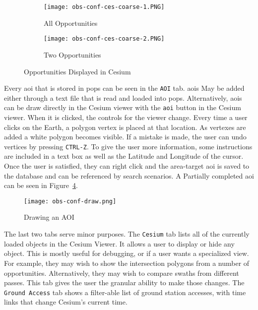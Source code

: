 \begin{figure}[h] 
    \centering
    \begin{subfigure}[b]{0.49\textwidth}
	\texttt{[image: obs-conf-ces-coarse-1.PNG]} 
	\caption{All Opportunities}
	\label{fig:obs-conf-opps-1} 
    \end{subfigure}
    \hfill
    \begin{subfigure}[b]{0.49\textwidth}
	\texttt{[image: obs-conf-ces-coarse-2.PNG]} 
	\caption{Two Opportunities}
	\label{fig:obs-conf-opps-2} 
    \end{subfigure}
    \caption{Opportunities Displayed in Cesium}
    \label{fig:obs-conf-opps} 
\end{figure}

Every \gls{aoi} that is stored in \gls{pops} can be seen in the \texttt{AOI}
tab. \gls{aois} May be added either through a text file that is read and loaded
into \gls{pops}. Alternatively, \glspl{aoi} can be draw directly in the Cesium
viewer with the \texttt{aoi} button in the Cesium viewer. When it is clicked,
the controls for the viewer change. Every time a user clicks on the Earth, a
polygon vertex is placed at that location. As vertexes are added a white
polygon becomes visible. If a mistake is made, the user can undo vertices by
pressing \texttt{CTRL-Z}. To give the user more information, some instructions
are included in a text box as well as the Latitude and Longitude of the cursor.
Once the user is satisfied, they can right click and the area-target \gls{aoi}
is saved to the database and can be referenced by search scenarios. A Partially
completed \gls{aoi} can be seen in Figure~\ref{fig:obs-conf-draw}.

\begin{figure}[h]
    \centering
    \texttt{[image: obs-conf-draw.png]} 
    \caption{Drawing an AOI}
    \label{fig:obs-conf-draw} 
\end{figure}

The last two tabs serve minor purposes. The \texttt{Cesium} tab lists all of
the currently loaded objects in the Cesium Viewer. It allows a user to display
or hide any object. This is mostly useful for debugging, or if a user wants a
specialized view. For example, they may wish to show the intersection polygons
from a number of opportunities. Alternatively, they may wish to compare swaths
from different passes. This tab gives the user the granular ability to make
those changes. The \texttt{Ground Access} tab shows a filter-able list of
ground station accesses, with time links that change Cesium's current time.

